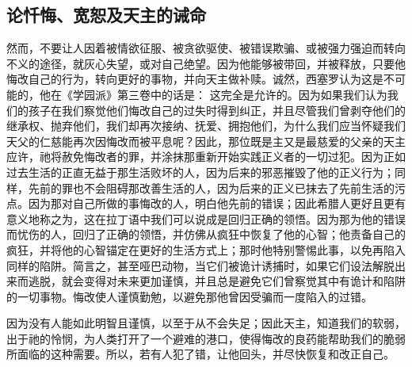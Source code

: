 
\subsection{论忏悔、宽恕及天主的诫命}

然而，不要让人因着被情欲征服、被贪欲驱使、被错误欺骗、或被强力强迫而转向不义的途径，就灰心失望，或对自己绝望。因为他能够被带回，并被释放，只要他悔改自己的行为，转向更好的事物，并向天主做补赎。诚然，西塞罗认为这是不可能的，他在《学园派》第三卷中的话是： 这完全是允许的。因为如果我们认为我们的孩子在我们察觉他们悔改自己的过失时得到纠正，并且尽管我们曾剥夺他们的继承权、抛弃他们，我们却再次接纳、抚爱、拥抱他们，为什么我们应当怀疑我们天父的仁慈能再次因悔改而被平息呢？因此，那位既是主又是最慈爱的父亲的天主应许，祂将赦免悔改者的罪，并涂抹那重新开始实践正义者的一切过犯。因为正如过去生活的正直无益于那生活败坏的人，因为后来的邪恶摧毁了他的正义行为；同样，先前的罪也不会阻碍那改善生活的人，因为后来的正义已抹去了先前生活的污点。因为那对自己所做的事悔改的人，明白他先前的错误；因此希腊人更好且更有意义地称之为，这在拉丁语中我们可以说成是回归正确的领悟。因为那为他的错误而忧伤的人，回归了正确的领悟，并仿佛从疯狂中恢复了他的心智；他责备自己的疯狂，并将他的心智锚定在更好的生活方式上；那时他特别警惕此事，以免再陷入同样的陷阱。简言之，甚至哑巴动物，当它们被诡计诱捕时，如果它们设法解脱出来而逃脱，就会变得对未来更加谨慎，并且总是避免它们曾察觉其中有诡计和陷阱的一切事物。悔改使人谨慎勤勉，以避免那他曾因受骗而一度陷入的过错。\par

因为没有人能如此明智且谨慎，以至于从不会失足；因此天主，知道我们的软弱，出于祂的怜悯，为人类打开了一个避难的港口，使得悔改的良药能帮助我们的脆弱所面临的这种需要。所以，若有人犯了错，让他回头，并尽快恢复和改正自己。\par

\par

